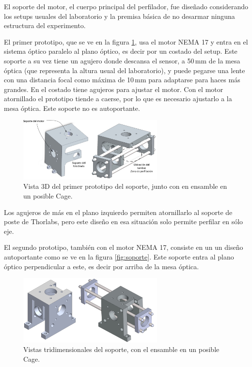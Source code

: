 El soporte del motor, el cuerpo principal del perfilador, fue diseñado considerando los setups usuales del laboratorio y la premisa básica de no desarmar ninguna estructura del experimento. 

El primer prototipo, que se ve en la figura \ref{fig:soporte_v1}, usa el motor NEMA 17 y entra en el sistema óptico paralelo al plano óptico, es decir por un costado del setup. Este soporte a su vez tiene un agujero donde descansa el sensor, a 50$\,$mm de la mesa óptica (que representa la altura usual del laboratorio), y puede pegarse una lente con una distancia focal como máxima de 10$\,$mm para adaptarse para haces más grandes. En el costado tiene agujeros para ajustar el motor. Con el motor atornillado el prototipo tiende a caerse, por lo que es necesario ajustarlo a la mesa óptica. Este soporte no es autoportante.

\begin{figure}[H]
\centering
\includegraphics[width=0.65\textwidth]{fig/perfilador/soporte_v1}
\caption{Vista 3D del primer prototipo del soporte, junto con en ensamble en un posible Cage.}
\label{fig:soporte_v1}
\end{figure}

Los agujeros de más en el plano izquierdo permiten atornillarlo al soporte de poste de Thorlabs, pero este diseño en esa situación solo permite perfilar en sólo eje.

El segundo prototipo, también con el motor NEMA 17, consiste en un un diseño autoportante como se ve en la figura \ref{fig:soporte}. Este soporte entra al plano óptico perpendicular a este, es decir por arriba de la mesa óptica.

\begin{figure}[H]
\centering
\includegraphics[width=0.65\textwidth]{fig/perfilador/soporte_v2}
\caption{Vistas tridimensionales del soporte, con el ensamble en un posible Cage.}
\label{fig:perfilador/soporte_v2}
\end{figure}

